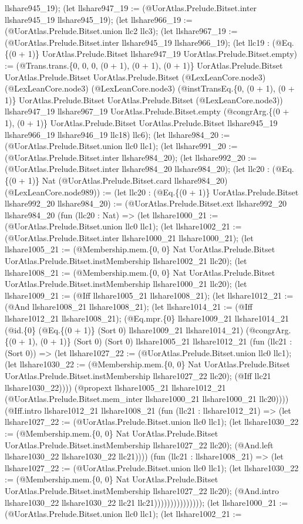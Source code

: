 \documentclass[11pt]{article}
\begin{document}
llshare945\_19); (let llshare947\_19 := (@UorAtlas.Prelude.Bitset.inter llshare945\_19 llshare945\_19); (let llshare966\_19 := (@UorAtlas.Prelude.Bitset.union llc2 llc3); (let llshare967\_19 := (@UorAtlas.Prelude.Bitset.inter llshare945\_19 llshare966\_19); (let llc19 : (@Eq.\{(0 + 1)\} UorAtlas.Prelude.Bitset llshare947\_19 UorAtlas.Prelude.Bitset.empty) := (@Trans.trans.\{0, 0, 0, (0 + 1), (0 + 1), (0 + 1)\} UorAtlas.Prelude.Bitset UorAtlas.Prelude.Bitset UorAtlas.Prelude.Bitset (@LexLeanCore.node3) (@LexLeanCore.node3) (@LexLeanCore.node3) (@instTransEq.\{0, (0 + 1), (0 + 1)\} UorAtlas.Prelude.Bitset UorAtlas.Prelude.Bitset (@LexLeanCore.node3)) llshare947\_19 llshare967\_19 UorAtlas.Prelude.Bitset.empty (@congrArg.\{(0 + 1), (0 + 1)\} UorAtlas.Prelude.Bitset UorAtlas.Prelude.Bitset llshare945\_19 llshare966\_19 llshare946\_19 llc18) llc6); (let llshare984\_20 := (@UorAtlas.Prelude.Bitset.union llc0 llc1); (let llshare991\_20 := (@UorAtlas.Prelude.Bitset.inter llshare984\_20); (let llshare992\_20 := (@UorAtlas.Prelude.Bitset.inter llshare984\_20 llshare984\_20); (let llc20 : (@Eq.\{(0 + 1)\} Nat (@UorAtlas.Prelude.Bitset.card llshare984\_20) (@LexLeanCore.node989)) := (let llc20 : (@Eq.\{(0 + 1)\} UorAtlas.Prelude.Bitset llshare992\_20 llshare984\_20) := (@UorAtlas.Prelude.Bitset.ext llshare992\_20 llshare984\_20 (fun (llc20 : Nat) => (let llshare1000\_21 := (@UorAtlas.Prelude.Bitset.union llc0 llc1); (let llshare1002\_21 := (@UorAtlas.Prelude.Bitset.inter llshare1000\_21 llshare1000\_21); (let llshare1005\_21 := (@Membership.mem.\{0, 0\} Nat UorAtlas.Prelude.Bitset UorAtlas.Prelude.Bitset.instMembership llshare1002\_21 llc20); (let llshare1008\_21 := (@Membership.mem.\{0, 0\} Nat UorAtlas.Prelude.Bitset UorAtlas.Prelude.Bitset.instMembership llshare1000\_21 llc20); (let llshare1009\_21 := (@Iff llshare1005\_21 llshare1008\_21); (let llshare1012\_21 := (@And llshare1008\_21 llshare1008\_21); (let llshare1014\_21 := (@Iff llshare1012\_21 llshare1008\_21); (@Eq.mpr.\{0\} llshare1009\_21 llshare1014\_21 (@id.\{0\} (@Eq.\{(0 + 1)\} (Sort 0) llshare1009\_21 llshare1014\_21) (@congrArg.\{(0 + 1), (0 + 1)\} (Sort 0) (Sort 0) llshare1005\_21 llshare1012\_21 (fun (llc21 : (Sort 0)) => (let llshare1027\_22 := (@UorAtlas.Prelude.Bitset.union llc0 llc1); (let llshare1030\_22 := (@Membership.mem.\{0, 0\} Nat UorAtlas.Prelude.Bitset UorAtlas.Prelude.Bitset.instMembership llshare1027\_22 llc20); (@Iff llc21 llshare1030\_22)))) (@propext llshare1005\_21 llshare1012\_21 (@UorAtlas.Prelude.Bitset.mem\_inter llshare1000\_21 llshare1000\_21 llc20)))) (@Iff.intro llshare1012\_21 llshare1008\_21 (fun (llc21 : llshare1012\_21) => (let llshare1027\_22 := (@UorAtlas.Prelude.Bitset.union llc0 llc1); (let llshare1030\_22 := (@Membership.mem.\{0, 0\} Nat UorAtlas.Prelude.Bitset UorAtlas.Prelude.Bitset.instMembership llshare1027\_22 llc20); (@And.left llshare1030\_22 llshare1030\_22 llc21)))) (fun (llc21 : llshare1008\_21) => (let llshare1027\_22 := (@UorAtlas.Prelude.Bitset.union llc0 llc1); (let llshare1030\_22 := (@Membership.mem.\{0, 0\} Nat UorAtlas.Prelude.Bitset UorAtlas.Prelude.Bitset.instMembership llshare1027\_22 llc20); (@And.intro llshare1030\_22 llshare1030\_22 llc21 llc21))))))))))))))); (let llshare1000\_21 := (@UorAtlas.Prelude.Bitset.union llc0 llc1); (let llshare1002\_21 := 
\end{document}

